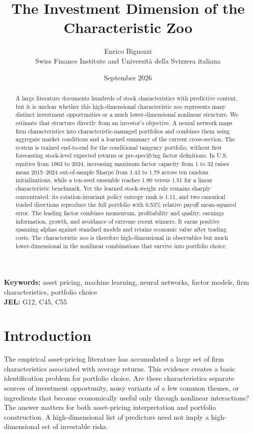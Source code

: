 \documentclass[12pt]{article}
\title{The Investment Dimension of the Characteristic Zoo}
\author{Enrico Bignozzi\\Swiss Finance Institute and Universit\`a della Svizzera italiana}
\date{September 2026}
\begin{document}
\maketitle
\begin{abstract}
A large literature documents hundreds of stock characteristics with predictive content, but it is unclear whether this high-dimensional characteristic zoo represents many distinct investment opportunities or a much lower-dimensional nonlinear structure. We estimate that structure directly from an investor's objective. A neural network maps firm characteristics into characteristic-managed portfolios and combines them using aggregate market conditions and a learned summary of the current cross-section. The system is trained end-to-end for the conditional tangency portfolio, without first forecasting stock-level expected returns or pre-specifying factor definitions. In U.S. equities from 1963 to 2024, increasing maximum factor capacity from 1 to 32 raises mean 2015--2024 out-of-sample Sharpe from 1.43 to 1.79 across ten random initializations, while a ten-seed ensemble reaches 1.90 versus 1.51 for a linear characteristic benchmark. Yet the learned stock-weight rule remains sharply concentrated: its rotation-invariant policy entropy rank is 1.11, and two canonical traded directions reproduce the full portfolio with 0.53\% relative payoff mean-squared error. The leading factor combines momentum, profitability and quality, earnings information, growth, and avoidance of extreme recent winners. It earns positive spanning alphas against standard models and retains economic value after trading costs. The characteristic zoo is therefore high-dimensional in observables but much lower-dimensional in the nonlinear combinations that survive into portfolio choice.
\end{abstract}

\vspace{0.3cm}
\noindent\textbf{Keywords:} asset pricing, machine learning, neural networks, factor models, firm characteristics, portfolio choice\\
\noindent\textbf{JEL:} G12, C45, C55

\newpage
\section{Introduction}
The empirical asset-pricing literature has accumulated a large set of firm characteristics associated with average returns. This evidence creates a basic identification problem for portfolio choice. Are these characteristics separate sources of investment opportunity, noisy variants of a few common themes, or ingredients that become economically useful only through nonlinear interactions? The answer matters for both asset-pricing interpretation and portfolio construction. A high-dimensional list of predictors need not imply a high-dimensional set of investable risks.
\end{document}

